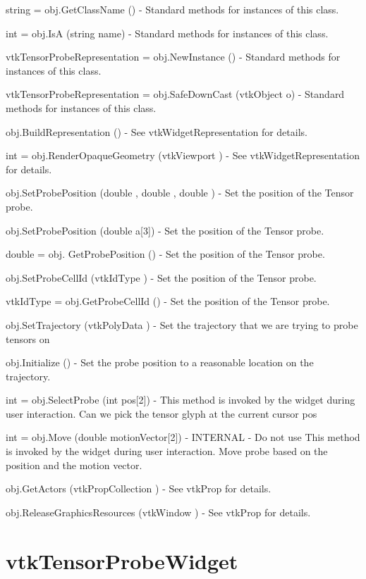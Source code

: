 \begin{DoxyItemize}
\item {\ttfamily string = obj.\-Get\-Class\-Name ()} -\/ Standard methods for instances of this class.  
\item {\ttfamily int = obj.\-Is\-A (string name)} -\/ Standard methods for instances of this class.  
\item {\ttfamily vtk\-Tensor\-Probe\-Representation = obj.\-New\-Instance ()} -\/ Standard methods for instances of this class.  
\item {\ttfamily vtk\-Tensor\-Probe\-Representation = obj.\-Safe\-Down\-Cast (vtk\-Object o)} -\/ Standard methods for instances of this class.  
\item {\ttfamily obj.\-Build\-Representation ()} -\/ See vtk\-Widget\-Representation for details.  
\item {\ttfamily int = obj.\-Render\-Opaque\-Geometry (vtk\-Viewport )} -\/ See vtk\-Widget\-Representation for details.  
\item {\ttfamily obj.\-Set\-Probe\-Position (double , double , double )} -\/ Set the position of the Tensor probe.  
\item {\ttfamily obj.\-Set\-Probe\-Position (double a\mbox{[}3\mbox{]})} -\/ Set the position of the Tensor probe.  
\item {\ttfamily double = obj. Get\-Probe\-Position ()} -\/ Set the position of the Tensor probe.  
\item {\ttfamily obj.\-Set\-Probe\-Cell\-Id (vtk\-Id\-Type )} -\/ Set the position of the Tensor probe.  
\item {\ttfamily vtk\-Id\-Type = obj.\-Get\-Probe\-Cell\-Id ()} -\/ Set the position of the Tensor probe.  
\item {\ttfamily obj.\-Set\-Trajectory (vtk\-Poly\-Data )} -\/ Set the trajectory that we are trying to probe tensors on  
\item {\ttfamily obj.\-Initialize ()} -\/ Set the probe position to a reasonable location on the trajectory.  
\item {\ttfamily int = obj.\-Select\-Probe (int pos\mbox{[}2\mbox{]})} -\/ This method is invoked by the widget during user interaction. Can we pick the tensor glyph at the current cursor pos  
\item {\ttfamily int = obj.\-Move (double motion\-Vector\mbox{[}2\mbox{]})} -\/ I\-N\-T\-E\-R\-N\-A\-L -\/ Do not use This method is invoked by the widget during user interaction. Move probe based on the position and the motion vector.  
\item {\ttfamily obj.\-Get\-Actors (vtk\-Prop\-Collection )} -\/ See vtk\-Prop for details.  
\item {\ttfamily obj.\-Release\-Graphics\-Resources (vtk\-Window )} -\/ See vtk\-Prop for details.  
\end{DoxyItemize}\hypertarget{vtkwidgets_vtktensorprobewidget}{}\section{vtk\-Tensor\-Probe\-Widget}\label{vtkwidgets_vtktensorprobewidget}
